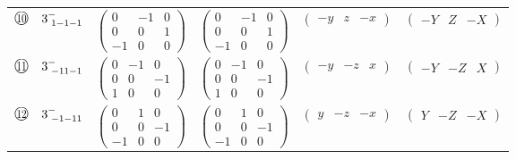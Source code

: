 \documentclass[fleqn,10pt,landscape]{jsarticle}
\begin{document}
\begin{center}
\begin{longtable}{lcccc}
$ {\ooalign{\hfil\resizebox{.8\width}{\height}{10}\hfil\crcr\raise.1ex\hbox{\large$\bigcirc$}}}\quad 3^{-}_{\,\,1-1-1} $ & $ \begin{pmatrix} 0 & -1 & 0 \\ 0 & 0 & 1 \\ -1 & 0 & 0 \end{pmatrix} $ & $ \begin{pmatrix} 0 & -1 & 0 \\ 0 & 0 & 1 \\ -1 & 0 & 0 \end{pmatrix} $ & $ \begin{pmatrix} - y & z & - x \end{pmatrix} $ & $ \begin{pmatrix} - Y & Z & - X \end{pmatrix} $ \\
$ {\ooalign{\hfil\resizebox{.8\width}{\height}{11}\hfil\crcr\raise.1ex\hbox{\large$\bigcirc$}}}\quad 3^{-}_{\,\,-11-1} $ & $ \begin{pmatrix} 0 & -1 & 0 \\ 0 & 0 & -1 \\ 1 & 0 & 0 \end{pmatrix} $ & $ \begin{pmatrix} 0 & -1 & 0 \\ 0 & 0 & -1 \\ 1 & 0 & 0 \end{pmatrix} $ & $ \begin{pmatrix} - y & - z & x \end{pmatrix} $ & $ \begin{pmatrix} - Y & - Z & X \end{pmatrix} $ \\
$ {\ooalign{\hfil\resizebox{.8\width}{\height}{12}\hfil\crcr\raise.1ex\hbox{\large$\bigcirc$}}}\quad 3^{-}_{\,\,-1-11} $ & $ \begin{pmatrix} 0 & 1 & 0 \\ 0 & 0 & -1 \\ -1 & 0 & 0 \end{pmatrix} $ & $ \begin{pmatrix} 0 & 1 & 0 \\ 0 & 0 & -1 \\ -1 & 0 & 0 \end{pmatrix} $ & $ \begin{pmatrix} y & - z & - x \end{pmatrix} $ & $ \begin{pmatrix} Y & - Z & - X \end{pmatrix} $ \\

\end{longtable}
\end{center}
\end{document}
